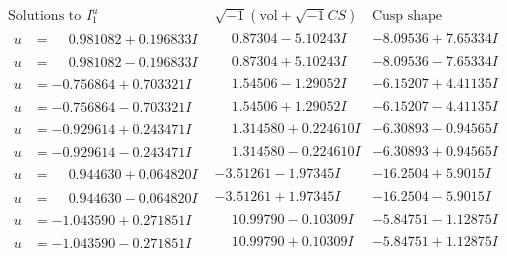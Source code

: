 \documentclass[1p]{elsarticle_modified}
\theoremstyle{definition}
\newcommand{\I}{\sqrt{-1}}
\begin{document}
$$\begin{array}{c|c|c}  
\text{Solutions to }I^u_{1}& \I (\text{vol} + \sqrt{-1}CS) & \text{Cusp shape}\\
 \hline 
\begin{aligned}
u &= \phantom{-}0.981082 + 0.196833 I\end{aligned}
 & \phantom{-}0.87304 - 5.10243 I & -8.09536 + 7.65334 I \\ \hline\begin{aligned}
u &= \phantom{-}0.981082 - 0.196833 I\end{aligned}
 & \phantom{-}0.87304 + 5.10243 I & -8.09536 - 7.65334 I \\ \hline\begin{aligned}
u &= -0.756864 + 0.703321 I\end{aligned}
 & \phantom{-}1.54506 - 1.29052 I & -6.15207 + 4.41135 I \\ \hline\begin{aligned}
u &= -0.756864 - 0.703321 I\end{aligned}
 & \phantom{-}1.54506 + 1.29052 I & -6.15207 - 4.41135 I \\ \hline\begin{aligned}
u &= -0.929614 + 0.243471 I\end{aligned}
 & \phantom{-}1.314580 + 0.224610 I & -6.30893 - 0.94565 I \\ \hline\begin{aligned}
u &= -0.929614 - 0.243471 I\end{aligned}
 & \phantom{-}1.314580 - 0.224610 I & -6.30893 + 0.94565 I \\ \hline\begin{aligned}
u &= \phantom{-}0.944630 + 0.064820 I\end{aligned}
 & -3.51261 - 1.97345 I & -16.2504 + 5.9015 I \\ \hline\begin{aligned}
u &= \phantom{-}0.944630 - 0.064820 I\end{aligned}
 & -3.51261 + 1.97345 I & -16.2504 - 5.9015 I \\ \hline\begin{aligned}
u &= -1.043590 + 0.271851 I\end{aligned}
 & \phantom{-}10.99790 - 0.10309 I & -5.84751 - 1.12875 I \\ \hline\begin{aligned}
u &= -1.043590 - 0.271851 I\end{aligned}
 & \phantom{-}10.99790 + 0.10309 I & -5.84751 + 1.12875 I \\ \hline\begin{aligned}

\end{aligned}
\end{array}$$
\end{document}
